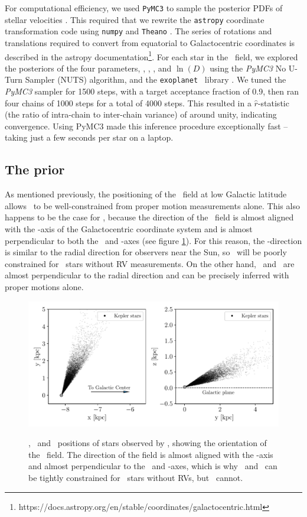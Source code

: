 For computational efficiency, we used {\tt PyMC3} to sample the posterior PDFs
of stellar velocities \citep{pymc3}.
This required that we rewrite the {\tt astropy} coordinate transformation code
using {\tt numpy} and {\tt Theano} \citep{numpy, theano}.
The series of rotations and translations required to convert from equatorial
to Galactocentric coordinates is described in the astropy
documentation\footnote{
    https://docs.astropy.org/en/stable/coordinates/galactocentric.html }.
For each star in the \kepler\ field, we explored the posteriors of the four
parameters, \vx, \vy, \vz, and $\ln(D)$ using the {\it PyMC3} No U-Turn
Sampler (NUTS) algorithm, and the {\tt exoplanet} \python\ library
\citep{exoplanet}.
We tuned the {\it PyMC3} sampler for 1500 steps, with a target acceptance
fraction of 0.9, then ran four chains of 1000 steps for a total of 4000 steps.
This resulted in a $\hat{r}$-statistic (the ratio of intra-chain to
inter-chain variance) of around unity, indicating convergence.
Using PyMC3 made this inference procedure exceptionally fast -- taking just a
few seconds per star on a laptop.

\subsection{The prior}
\label{sec:prior}

As mentioned previously, the positioning of the \kepler\ field at low Galactic
latitude allows \vz\ to be well-constrained from proper motion measurements
alone.
This also happens to be the case for \vx, because the direction of the
\kepler\ field is almost aligned with the \y-axis of the Galactocentric
coordinate system and is almost perpendicular to both the \x\ and \z-axes (see
figure \ref{fig:kepler_field}).
For this reason, the \y-direction is similar to the radial direction for
observers near the Sun, so \vy\ will be poorly constrained for \kepler\ stars
without RV measurements.
On the other hand, \vx\ and \vz\ are almost perpendicular to the radial
direction and can be precisely inferred with proper motions alone.
\begin{figure}[ht!]
\caption{
\x, \y\ and \z\ positions of stars observed by \kepler, showing the
    orientation of the \kepler\ field.
The direction of the field is almost aligned with the \y-axis and almost
    perpendicular to the \x\ and \z-axes, which is why \vx\ and \vz\ can be
    tightly constrained for \kepler\ stars without RVs, but \vy\ cannot.
}
  \centering
    \includegraphics[width=.7\textwidth]{kepler_field}
\label{fig:kepler_field}
\end{figure}

